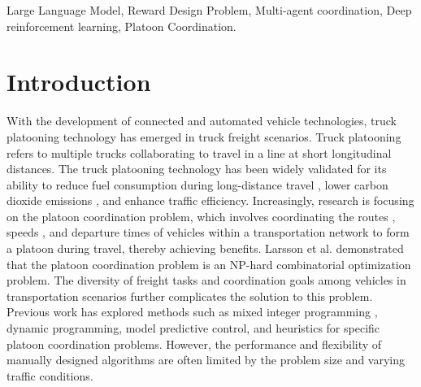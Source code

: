 \documentclass[lettersize,journal]{IEEEtran}
\begin{document}
\begin{abstract}
In this method, LLM first initializes reward functions based on environment code and task requirements with an Analysis and Initial Reward (AIR) module, and then iteratively optimizes them based on training feedback with an evolutionary module.
The AIR module guides LLM to deepen their understanding of code and tasks through a chain of thought, effectively mitigating hallucination risks in code generation.
The evolutionary module fine-tunes and reconstructs the reward function, achieving a balance between exploration diversity and convergence stability for training.
To validate our approach, we establish six challenging coordination scenarios with varying complexity levels within the Yangtze River Delta transportation network simulation.
Comparative experimental results demonstrate that RL agents utilizing PCRD-generated reward functions consistently outperform human-engineered reward functions, achieving an average of 10\% higher performance metrics in all scenarios.
\end{abstract}

\begin{IEEEkeywords}
Large Language Model, Reward Design Problem, Multi-agent coordination, Deep reinforcement learning, Platoon Coordination.
\end{IEEEkeywords}

\section{Introduction}
With the development of connected and automated vehicle technologies, truck platooning technology has emerged in truck freight scenarios. 
Truck platooning refers to multiple trucks collaborating to travel in a line at short longitudinal distances. 
The truck platooning technology has been widely validated for its ability to reduce fuel consumption during long-distance travel \cite{jiang2024cooperative}, lower carbon dioxide emissions \cite{tsugawa2014results}, and enhance traffic efficiency. 
Increasingly, research is focusing on the platoon coordination problem, which involves coordinating the routes \cite{van2017fuel, xu2022optimizing,hu2024optimal}, speeds \cite{hoef2019predictive, liang2015heavy}, and departure times \cite{choi2024optimizing, bouchery2022coalition,bai2023large} of vehicles within a transportation network to form a platoon during travel, thereby achieving benefits. 
Larsson et al. \cite{larsson2015vehicle} demonstrated that the platoon coordination problem is an NP-hard combinatorial optimization problem. 
The diversity of freight tasks and coordination goals among vehicles in transportation scenarios further complicates the solution to this problem. 
Previous work has explored methods such as mixed integer programming \cite{van2017efficient}, dynamic programming\cite{bai2023large,xiong2024approximate}, model predictive control\cite{bai2021event}, and heuristics\cite{hoef2019predictive} for specific platoon coordination problems.
However, the performance and flexibility of manually designed algorithms are often limited by the problem size and varying traffic conditions.
\end{document}
